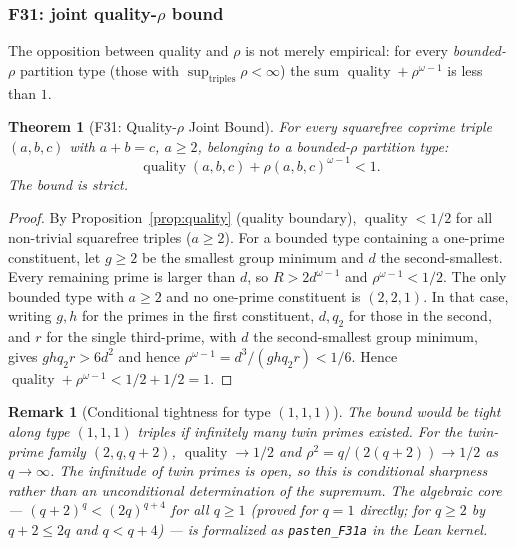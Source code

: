 \documentclass[12pt]{article}
\newtheorem{theorem}{Theorem}
\newtheorem{remark}{Remark}
\theoremstyle{definition}
\begin{document}
\subsubsection*{F31: joint quality-\texorpdfstring{$\rho$}{rho} bound}

The opposition between quality and $\rho$ is not merely empirical: for every
\emph{bounded-$\rho$} partition type (those with $\sup_{\text{triples}} \rho < \infty$)
the sum $\operatorname{quality} + \rho^{\omega-1}$ is less than $1$.

\begin{theorem}[F31: Quality-$\rho$ Joint Bound]\label{thm:f31}
  For every squarefree coprime triple $(a,b,c)$ with $a+b=c$, $a \ge 2$, belonging to
  a bounded-$\rho$ partition type:
  \[
    \operatorname{quality}(a,b,c) + \rho(a,b,c)^{\omega-1} < 1.
  \]
  The bound is strict.
\end{theorem}

\begin{proof}
  By Proposition~\ref{prop:quality} (quality boundary), $\operatorname{quality} < 1/2$ for all
  non-trivial squarefree triples ($a \ge 2$).
  For a bounded type containing a one-prime constituent, let $g\ge2$ be the
  smallest group minimum and $d$ the second-smallest.  Every remaining prime
  is larger than $d$, so $R>2d^{\omega-1}$ and
  $\rho^{\omega-1}<1/2$.  The only bounded type with $a\ge2$ and no
  one-prime constituent is $(2,2,1)$.  In that case, writing $g,h$ for the
  primes in the first constituent, $d,q_2$ for those in the second, and $r$
  for the single third-prime, with $d$ the second-smallest group minimum,
  gives $ghq_2r>6d^2$ and hence $\rho^{\omega-1}=d^3/(ghq_2r)<1/6$.
  Hence $\operatorname{quality} + \rho^{\omega-1} < 1/2 + 1/2 = 1$.
\end{proof}

\begin{remark}[Conditional tightness for type $(1,1,1)$]
  The bound would be tight along type $(1,1,1)$ triples if infinitely many twin
  primes existed.  For the twin-prime family $(2,q,q+2)$,
  $\operatorname{quality} \to 1/2$ and
  $\rho^2 = q/(2(q+2)) \to 1/2$ as $q \to \infty$.  The infinitude of twin primes
  is open, so this is conditional sharpness rather than an unconditional
  determination of the supremum.
  The algebraic core --- $(q+2)^q < (2q)^{q+4}$ for all $q \ge 1$ (proved for $q=1$
  directly; for $q \ge 2$ by $q+2 \le 2q$ and $q < q+4$) ---
  is formalized as \texttt{pasten\_F31a} in the Lean kernel.
\end{remark}
\end{document}
